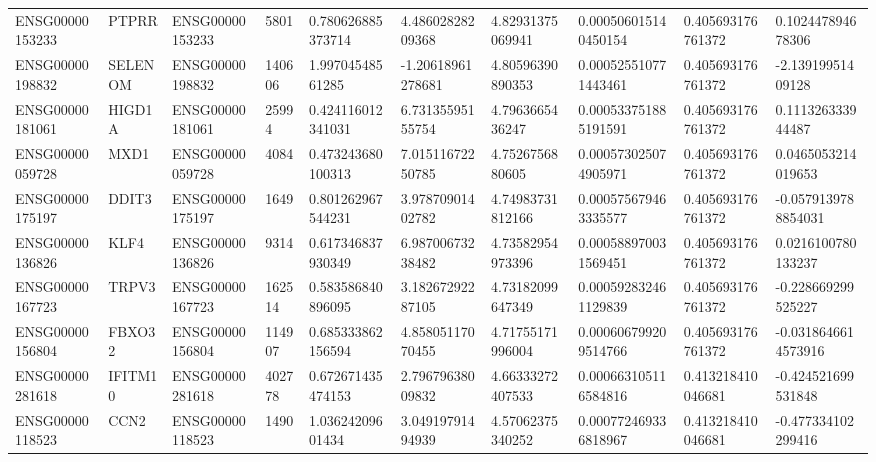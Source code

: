 \begin{tabular}{@{}llllllllll@{}}
ENSG00000153233 & PTPRR & ENSG00000153233 & 5801 & 0.780626885373714 & 4.48602828209368 & 4.82931375069941 & 0.000506015140450154 & 0.405693176761372 & 0.102447894678306 \\
ENSG00000198832 & SELENOM & ENSG00000198832 & 140606 & 1.99704548561285 & -1.20618961278681 & 4.80596390890353 & 0.000525510771443461 & 0.405693176761372 & -2.13919951409128 \\
ENSG00000181061 & HIGD1A & ENSG00000181061 & 25994 & 0.424116012341031 & 6.73135595155754 & 4.7963665436247 & 0.000533751885191591 & 0.405693176761372 & 0.111326333944487 \\
ENSG00000059728 & MXD1 & ENSG00000059728 & 4084 & 0.473243680100313 & 7.01511672250785 & 4.7526756880605 & 0.000573025074905971 & 0.405693176761372 & 0.0465053214019653 \\
ENSG00000175197 & DDIT3 & ENSG00000175197 & 1649 & 0.801262967544231 & 3.97870901402782 & 4.74983731812166 & 0.000575679463335577 & 0.405693176761372 & -0.0579139788854031 \\
ENSG00000136826 & KLF4 & ENSG00000136826 & 9314 & 0.617346837930349 & 6.98700673238482 & 4.73582954973396 & 0.000588970031569451 & 0.405693176761372 & 0.0216100780133237 \\
ENSG00000167723 & TRPV3 & ENSG00000167723 & 162514 & 0.583586840896095 & 3.18267292287105 & 4.73182099647349 & 0.000592832461129839 & 0.405693176761372 & -0.228669299525227 \\
ENSG00000156804 & FBXO32 & ENSG00000156804 & 114907 & 0.685333862156594 & 4.85805117070455 & 4.71755171996004 & 0.000606799209514766 & 0.405693176761372 & -0.0318646614573916 \\
ENSG00000281618 & IFITM10 & ENSG00000281618 & 402778 & 0.672671435474153 & 2.79679638009832 & 4.66333272407533 & 0.000663105116584816 & 0.413218410046681 & -0.424521699531848 \\
ENSG00000118523 & CCN2 & ENSG00000118523 & 1490 & 1.03624209601434 & 3.04919791494939 & 4.57062375340252 & 0.000772469336818967 & 0.413218410046681 & -0.477334102299416 \\
\bottomrule
\end{tabular}
\endgroup
